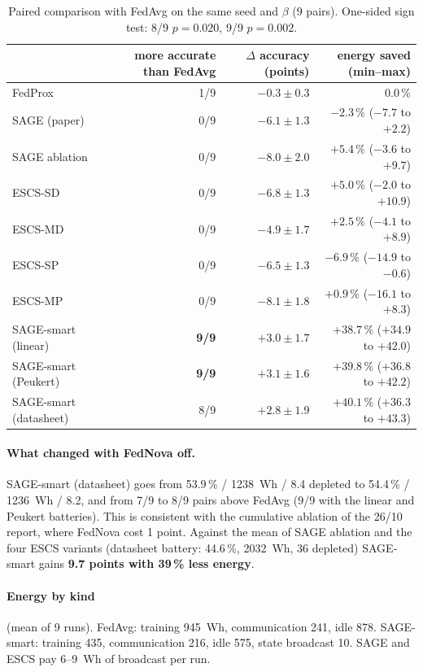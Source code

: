 \documentclass[11pt,a4paper]{article}
\begin{document}
\begin{table}[H]
\centering
\small
\caption{Paired comparison with FedAvg on the same seed and $\beta$ (9 pairs).
One-sided sign test: 8/9 $p=0.020$, 9/9 $p=0.002$.}
\label{tab:paired}
\begin{tabular}{lrrr}
\toprule
& more accurate than FedAvg & $\Delta$ accuracy (points) & energy saved (min--max) \\
\midrule
FedProx                   & 1/9 & $-0.3 \pm 0.3$ & $0.0\,\%$ \\
SAGE (paper)              & 0/9 & $-6.1 \pm 1.3$ & $-2.3\,\%$ ($-7.7$ to $+2.2$) \\
SAGE ablation             & 0/9 & $-8.0 \pm 2.0$ & $+5.4\,\%$ ($-3.6$ to $+9.7$) \\
ESCS-SD                   & 0/9 & $-6.8 \pm 1.3$ & $+5.0\,\%$ ($-2.0$ to $+10.9$) \\
ESCS-MD                   & 0/9 & $-4.9 \pm 1.7$ & $+2.5\,\%$ ($-4.1$ to $+8.9$) \\
ESCS-SP                   & 0/9 & $-6.5 \pm 1.3$ & $-6.9\,\%$ ($-14.9$ to $-0.6$) \\
ESCS-MP                   & 0/9 & $-8.1 \pm 1.8$ & $+0.9\,\%$ ($-16.1$ to $+8.3$) \\
SAGE-smart (linear)       & \textbf{9/9} & $+3.0 \pm 1.7$ & $+38.7\,\%$ ($+34.9$ to $+42.0$) \\
SAGE-smart (Peukert)      & \textbf{9/9} & $+3.1 \pm 1.6$ & $+39.8\,\%$ ($+36.8$ to $+42.2$) \\
SAGE-smart (datasheet)    & 8/9 & $+2.8 \pm 1.9$ & $\mathbf{+40.1\,\%}$ ($+36.3$ to $+43.3$) \\
\bottomrule
\end{tabular}
\end{table}

\paragraph{What changed with FedNova off.} SAGE-smart (datasheet) goes from
53.9\,\% / 1238~Wh / 8.4 depleted to 54.4\,\% / 1236~Wh / 8.2, and from 7/9 to
8/9 pairs above FedAvg (9/9 with the linear and Peukert batteries). This is
consistent with the cumulative ablation of the 26/10 report, where FedNova cost
1 point. Against the mean of SAGE ablation and the four ESCS variants (datasheet
battery: 44.6\,\%, 2032~Wh, 36 depleted) SAGE-smart gains \textbf{9.7 points
with 39\,\% less energy}.

\paragraph{Energy by kind} (mean of 9 runs). FedAvg: training 945~Wh,
communication 241, idle 878. SAGE-smart: training 435, communication 216, idle
575, state broadcast 10. SAGE and ESCS pay 6--9~Wh of broadcast per run.
\end{document}
